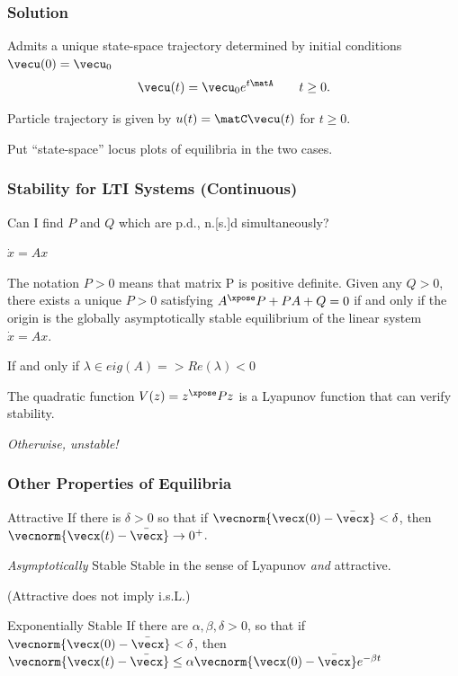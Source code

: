 \documentclass[12pt]{beamer}
\begin{document}
\begin{frame}
\frametitle{Solution}

\begin{itemize}

\vitem Admits a unique state-space trajectory determined by initial conditions $\vecu(0) = \vecu_0$
\[
  \vecu(t) = \vecu_0 e^{t \matA }
  \qquad t \geq 0.
\]

\vitem Particle trajectory is given by $u(t) = \matC \vecu(t)$ for $t \geq 0$.

\end{itemize}
\vfill\null

\end{frame}




\begin{frame}
Put ``state-space'' locus plots of equilibria in the two cases.
\end{frame}





\begin{frame}
\frametitle{Stability for LTI Systems (Continuous)}


Can I find $P$ and $Q$ which are p.d., n.[s.]d simultaneously?

$\dot x = Ax$

The notation $P > 0$ means that matrix P is positive definite.
Given any $Q > 0$, there exists a unique $P > 0$ satisfying 
$A^\xpose P + P A + Q = 0$ if and only if the origin is the globally asymptotically stable equilibrium of the linear system $\dot x = A x$.

If and only if $\lambda \in eig(A) => Re(\lambda) < 0$

The quadratic function $V(z) = z^\xpose P z$ is a Lyapunov function that can verify stability.

\emph{Otherwise, unstable!}

\end{frame}





\begin{frame}
\frametitle{Other Properties of Equilibria}

\begin{block}{Attractive}
If there is $\delta > 0$ so that if $\vecnorm{\vecx(0)-\bar\vecx} < \delta$, then
$\vecnorm{\vecx(t)-\bar{\vecx}} \to 0^+$.
\end{block}

\begin{block}{\emph{Asymptotically} Stable}
Stable in the sense of Lyapunov \emph{and} attractive.

(Attractive does not imply i.s.L.)
\end{block}

\begin{block}{Exponentially Stable}
If there are $\alpha, \beta, \delta >0$, so that if
$\vecnorm{\vecx(0)-\bar{\vecx}} < \delta$, then
$\vecnorm{\vecx(t)-\bar\vecx}
	\leq \alpha \vecnorm{\vecx(0)-\bar\vecx} e^{-\beta t}$
\end{block}

\end{frame}
\end{document}
